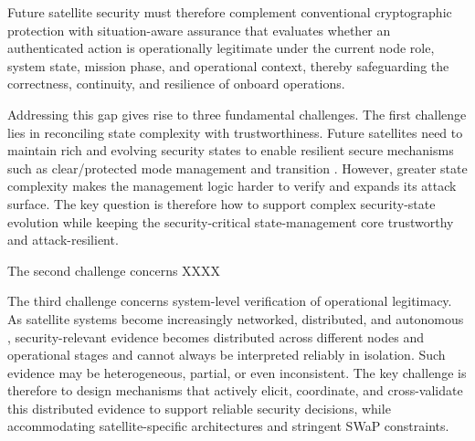 \documentclass[journal]{IEEEtran}
\begin{document}
Future satellite security must therefore complement conventional cryptographic protection with situation-aware assurance that evaluates whether an authenticated action is operationally legitimate under the current node role, system state, mission phase, and operational context, thereby safeguarding the correctness, continuity, and resilience of onboard operations.

Addressing this gap gives rise to three fundamental challenges.
The first challenge lies in reconciling state complexity with trustworthiness. Future satellites need to maintain rich and evolving security states to enable resilient secure mechanisms such as clear/protected mode management and transition \cite{huang2026toward}. 
However, greater state complexity makes the management logic harder to verify and expands its attack surface. The key question is therefore how to support complex security-state evolution while keeping the security-critical state-management core trustworthy and attack-resilient. 

The second challenge concerns XXXX

The third challenge concerns system-level verification of operational legitimacy.
As satellite systems become increasingly networked, distributed, and autonomous \cite{thangavel2024artificial}, security-relevant evidence becomes distributed across different nodes and operational stages and cannot always be interpreted reliably in isolation.
Such evidence may be heterogeneous, partial, or even inconsistent. The key challenge is therefore to design mechanisms that actively elicit, coordinate, and cross-validate this distributed evidence to support reliable security decisions, while accommodating satellite-specific architectures and stringent SWaP constraints.
\end{document}
